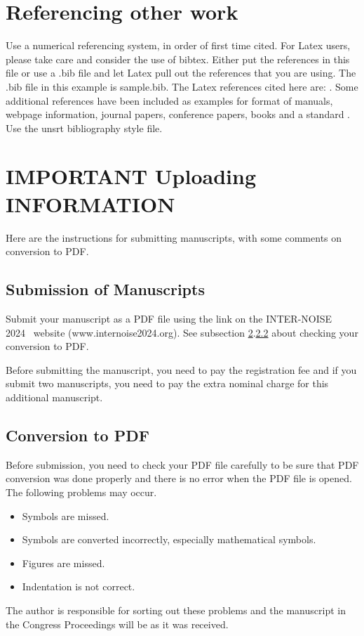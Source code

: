 \documentclass[a4paper,12pt]{article}
\newcommand{\YearConf}{2024}
\begin{document}
\section{Referencing other work}
\noindent
Use a numerical referencing system, in order of first time cited.  For Latex users, please take care and consider the use of bibtex.   Either put the references in this file or use a .bib file and let Latex pull out the references that you are using.  The .bib file in this example is sample.bib.  The Latex references cited here are:  \cite{latexcompanion, knuthwebsite}.  Some additional references have been included as examples for format of manuals, webpage information, journal papers, conference papers, books and a standard \cite{Poulsen1, Ryherd2007, Tang2006, May96,  Zwicker_Fastl_2006, ANSI_S3_4}. \\

Use the unsrt bibliography style file.  

\section{IMPORTANT Uploading INFORMATION}
   \label{important}
\noindent
Here are the instructions for submitting manuscripts, with some comments on conversion to PDF.
\subsection{Submission of Manuscripts}
\noindent
Submit your manuscript as a PDF file using the link on the INTER-NOISE \YearConf ~ website (www.internoise\YearConf.org).  See subsection \ref{important}.\ref{conversion} about checking your conversion to PDF.

Before submitting the manuscript, you need to pay the registration fee and if you submit two manuscripts, you need to pay the extra nominal charge for this additional manuscript.

\subsection{Conversion to PDF}
  \label{conversion}
\noindent
Before submission, you need to check your PDF file carefully to be sure that PDF conversion was done properly and there is no error when the PDF file is opened. The following problems may occur.
\begin{itemize}[noitemsep]
\item
Symbols are missed.
\item
Symbols are converted incorrectly, especially mathematical symbols.
\item
Figures are missed.
\item
Indentation is not correct.
\end{itemize}
The author is responsible for sorting out these problems and the manuscript  in the Congress Proceedings will be as it was received.
\end{document}
